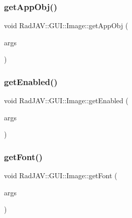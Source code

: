 \subsubsection{\texorpdfstring{get\+App\+Obj()}{getAppObj()}}
{\footnotesize\ttfamily void Rad\+J\+A\+V\+::\+G\+U\+I\+::\+Image\+::get\+App\+Obj (\begin{DoxyParamCaption}\item[{const v8\+::\+Function\+Callback\+Info$<$ v8\+::\+Value $>$ \&}]{args }\end{DoxyParamCaption})\hspace{0.3cm}{\ttfamily [static]}}

\mbox{\label{class_rad_j_a_v_1_1_g_u_i_1_1_image_a2fdd66448f0821aa5e17c56de1220f71}} 
\subsubsection{\texorpdfstring{get\+Enabled()}{getEnabled()}}
{\footnotesize\ttfamily void Rad\+J\+A\+V\+::\+G\+U\+I\+::\+Image\+::get\+Enabled (\begin{DoxyParamCaption}\item[{const v8\+::\+Function\+Callback\+Info$<$ v8\+::\+Value $>$ \&}]{args }\end{DoxyParamCaption})\hspace{0.3cm}{\ttfamily [static]}}

\mbox{\label{class_rad_j_a_v_1_1_g_u_i_1_1_image_ac1308efc66dde5b2d3445990e4451257}} 
\subsubsection{\texorpdfstring{get\+Font()}{getFont()}}
{\footnotesize\ttfamily void Rad\+J\+A\+V\+::\+G\+U\+I\+::\+Image\+::get\+Font (\begin{DoxyParamCaption}\item[{const v8\+::\+Function\+Callback\+Info$<$ v8\+::\+Value $>$ \&}]{args }\end{DoxyParamCaption})\hspace{0.3cm}{\ttfamily [static]}}

